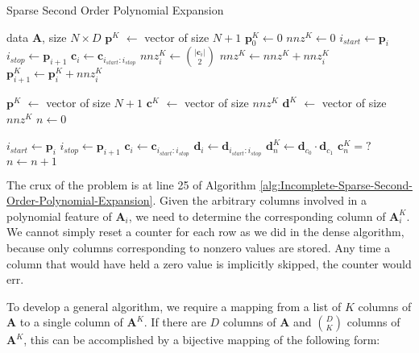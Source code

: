 \documentclass{article}
\begin{document}


\begin{algorithm}%
   \caption{Sparse Second Order Polynomial Expansion}
   \label{alg:Incomplete-Sparse-Second-Order-Polynomial-Expansion}
\begin{algorithmic}[1]
    data $\bm{A}$, size $N \times D$
   \STATE $\bm{p}^K$ $\gets$ vector of size $N+1$
   \STATE $\bm{p}^K_0 \gets 0$
   \STATE $nnz^K \gets 0$
      \STATE $i_{start} \gets \bm{p}_i$
      \STATE $i_{stop} \gets \bm{p}_{i+1}$
      \STATE $\bm{c}_i \gets \bm{c}_{i_{start}:i_{stop}}$
      \STATE $nnz^K_i \gets \binom{|\bm{c}_i|}{2}$ \label{li:row_nnz_count}
      \STATE $nnz^K \gets nnz^K + nnz^K_i$
      \STATE $\bm{p}^K_{i+1} \gets \bm{p}^K_i + nnz^K_i$
  \ENDFOR
  
  \STATE $\bm{p}^K$ $\gets$ vector of size $N+1$
  \STATE $\bm{c}^K$ $\gets$ vector of size $nnz^K$
  \STATE $\bm{d}^K$ $\gets$ vector of size $nnz^K$
  \STATE $n \gets 0$
  
      \STATE $i_{start} \gets \bm{p}_i$
      \STATE $i_{stop} \gets \bm{p}_{i+1}$
      \STATE $\bm{c}_i \gets \bm{c}_{i_{start}:i_{stop}}$
      \STATE $\bm{d}_i \gets \bm{d}_{i_{start}:i_{stop}}$
              \STATE $\bm{d}^K_{n} \gets \bm{d}_{c_0} \cdot \bm{d}_{c_1}$
              \STATE $\bm{c}^K_{n} = ?$ \label{li:set_ck}
              \STATE $n \gets n + 1$
          \ENDFOR
      \ENDFOR
  \ENDFOR
\end{algorithmic}
\end{algorithm}

The crux of the problem is at line 25 of Algorithm \ref{alg:Incomplete-Sparse-Second-Order-Polynomial-Expansion}.
Given the arbitrary columns involved in a polynomial feature of $\bm{A}_i$, we need to determine the corresponding column of $\bm{A}^K_i$.
We cannot simply reset a counter for each row as we did in the dense algorithm,  because only columns corresponding to nonzero values are stored.
Any time a column that would have held a zero value is implicitly skipped, the counter would err.

To develop a general algorithm, we require a mapping from a list of $K$ columns of $\bm{A}$ to a single column of $\bm{A}^K$.
If there are $D$ columns of $\bm{A}$ and $\binom{D}{K}$ columns of $\bm{A}^K$, this can be accomplished by a bijective mapping of the following form:
\end{document}
